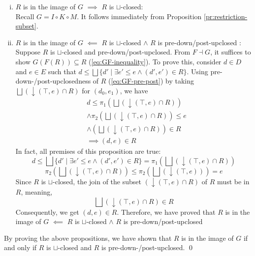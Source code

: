 \documentclass{llncs}
\newcommand{\join}{\sqcup}
\newcommand{\bigjoin}{\bigsqcup}
\newcommand{\comp}{\circ}
\begin{document}
\begin{enumerate}[i.]
\item{$R$ is in the image of $G$ $\implies$ $R$ is $\join$-closed:}\\
  Recall $G = I \comp K \comp M$. It follows immediately from Proposition \ref{pr:restriction-subset}.
\item{$R$ is in the image of $G$ $\impliedby$ $R$ is $\join$-closed $\land$ $R$ is pre-down/post-upclosed :}\\
  Suppose $R$ is $\join$-closed and pre-down/post-upclosed.
  From $F \dashv G$, it suffices to show $G(F(R)) \subseteq R$ (\ref{eq:GF-inequality}).
  To prove this, consider $d \in D$ and $e \in E$ such that $d \leq \bigjoin \{d' \mid \exists e' \leq e \land (d' , e') \in R \}$.
  Using pre-down-/post-upclosedness of $R$ (\ref{eq:GF-pre-post}) by taking $\bigjoin (\downarrow (\top , e) \cap R)$ for $(d_0 , e_1)$, we have
  \begin{align*}
    &d \leq \pi_{1} (\bigjoin (\downarrow (\top , e) \cap R)) \\
    &\land \pi_{2} (\bigjoin (\downarrow (\top , e) \cap R)) \leq e\\
    &\land (\bigjoin (\downarrow (\top , e) \cap R)) \in R\\
    &\implies (d, e) \in R
  \end{align*}
  In fact, all premises of this proposition are true:
  \begin{equation}
     d \leq \bigjoin \{d' \mid \exists e' \leq e \land (d' , e') \in R \} = \pi_{1} (\bigjoin (\downarrow (\top , e) \cap R))
  \end{equation}
  \begin{equation}
     \pi_{2} (\bigjoin (\downarrow (\top , e) \cap R)) \leq \pi_{2} (\bigjoin (\downarrow (\top , e))) = e
  \end{equation}
   Since $R$ is $\join$-closed, the join of the subset $(\downarrow (\top , e) \cap R)$ of $R$ must be in $R$, meaning,
  \begin{equation*} \bigjoin (\downarrow (\top , e) \cap R) \in R
  \end{equation*}
  Consequently, we get $(d, e) \in R$.
  Therefore, we have proved that $R$ is in the image of $G$ $\impliedby$ $R$ is $\join$-closed $\land$ $R$ is pre-down/post-upclosed
\end{enumerate}
By proving the above propositions, we have shown that $R$ is in the image of $G$ if and only if $R$ is $\join$-closed and $R$ is pre-down-/post-upclosed. \qed
\end{document}
